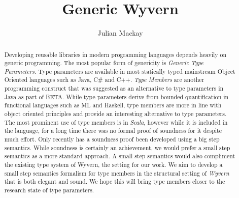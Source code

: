 \documentclass[11pt
              , a4paper
              , twoside
              , openright
              ]{report}
\title{Generic Wyvern}
\author{Julian Mackay}
\date{}
\numberwithin{case}{theorem}
\numberwithin{subcase}{case}
\begin{document}
\frontmatter



\begin{abstract}
Developing reusable libraries in modern programming languages depends heavily on generic programming. The most popular form of genericity is \emph{Generic Type Parameters}. Type parameters are available in most statically typed mainstream Object Oriented languages such as Java, C\# and C++. \emph{Type Members} are another programming construct that was suggested as an alternative to type parameters in Java as part of BETA. While type parameters derive from bounded quantification in functional languages such as ML and Haskell, type members are more in line with object oriented principles and provide an interesting alternative to type parameters. The most prominent use of type members is in \emph{Scala}, however while it is included in the language, for a long time there was no formal proof of soundness for it despite much effort. Only recently has a soundness proof been developed using a big step semantics. While soundness is certainly an achievement, we would prefer a small step semantics as a more standard approach. A small step semantics would also compliment the existing type system of Wyvern, the setting for our work. We aim to develop a small step semantics formalism for type members in the structural setting of \emph{Wyvern} that is both elegant and sound. We hope this will bring type members closer to the research state of type parameters. 
\end{abstract}


\maketitle

%

\tableofcontents



\mainmatter

\end{document}

